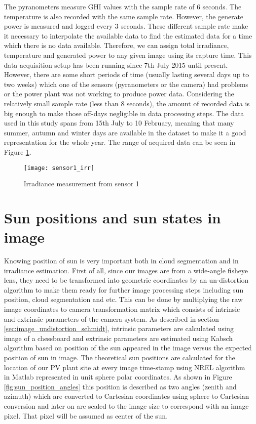 The pyranometers measure GHI values with the sample rate of 6 seconds. The temperature is also recorded with the same sample rate. However, the generate power is measured and logged every 3 seconds. These different sample rate make it necessary to interpolate the available data to find the estimated data for a time which there is no data available. Therefore, we can assign total irradiance, temperature and generated power to any given image using its capture time. This data acquisition setup has been running since 7th July 2015 until present. However, there are some short periods of time (usually lasting several days up to two weeks) which one of the sensors (pyranometers or the camera) had problems or the power plant was not working to produce power data. Considering the relatively small sample rate (less than 8 seconds), the amount of recorded data is big enough to make those off-days negligible in data processing steps. The data used in this study spans from 15th July to 10 February, meaning that many summer, autumn and winter days are available in the dataset to make it a good representation for the whole year.  The range of acquired data can be seen in Figure \ref{fig:sensor1_measures}.

\begin{figure}[h]
\caption{Irradiance measurement from sensor 1}
\label{fig:sensor1_measures}
\texttt{[image: sensor1\_irr]}
\centering
\end{figure}


\section{Sun positions and sun states in image}
\label{sec:sun-states}
Knowing position of sun is very important both in cloud segmentation and in irradiance estimation. First of all, since our images are from a wide-angle fisheye lens, they need to be transformed into geometric coordinates by an un-distortion algorithm to make them ready for further image processing steps including sun position, cloud segmentation and etc. This can be done by multiplying the raw image coordinates to camera transformation matrix which consists of intrinsic and extrinsic parameters of the camera system. As described in section \ref{sec:image_undistortion_schmidt}, intrinsic parameters are calculated using image of a chessboard\cite{fisheye_undistort} and extrinsic parameters are estimated using Kabsch algorithm\cite{Kabsch_alg} based on position of the sun appeared in the image versus the expected position of sun in image. The theoretical sun positions are calculated for the location of our PV plant site at every image time-stamp using NREL algorithm \cite{our_sun_position} in Matlab represented in unit sphere polar coordinates. As shown in Figure \ref{fig:sun_position_angles} this position is described as two angles (zenith and azimuth) which are converted to Cartesian coordinates using sphere to Cartesian conversion and later on are scaled to the image size to correspond with an image pixel. That pixel will be assumed as center of the sun.

